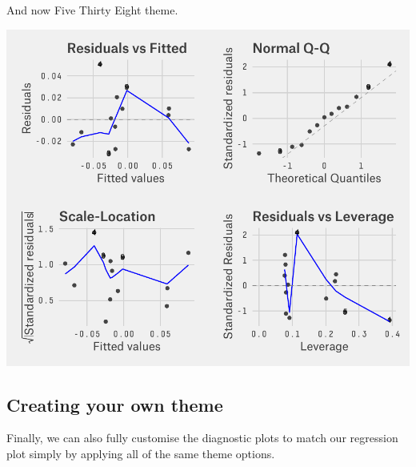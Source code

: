 And now Five Thirty Eight theme.

\begin{Shaded}
\begin{Highlighting}[]
 \NormalTok{) +}\StringTok{ }\NormalTok{() +}\StringTok{ }
\StringTok{  }\NormalTok{(} \NormalTok{(}\NormalTok{),}
    \NormalTok{, }
    \NormalTok{,}
     \NormalTok{,}
    \NormalTok{(}\NormalTok{, } \NormalTok{), }
    \NormalTok{(}\NormalTok{))}
\end{Highlighting}
\end{Shaded}

\begin{center}\includegraphics[width=0.6\linewidth]{11_Linear_Regression_Plot_pdf/lr_23-1} \end{center}

\subsection{Creating your own theme}\label{creating-your-own-theme-1}

Finally, we can also fully customise the diagnostic plots to match our
regression plot simply by applying all of the same theme options.

